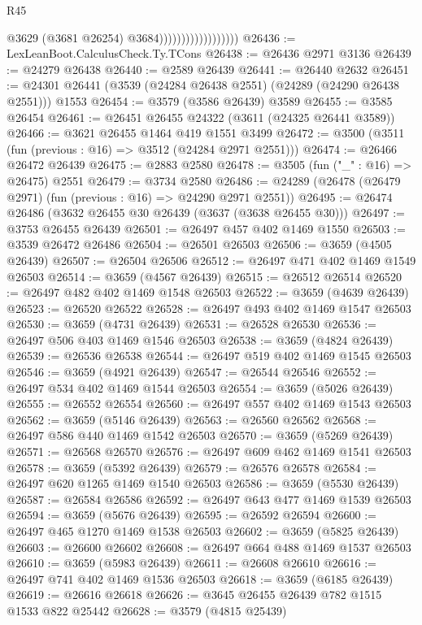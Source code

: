 \begin{lexlean}{R45}
\begin{coremodule}
                                        @3629
                                        (@3681 @26254)
                                        @3684))))))))))))))))))
@26436 := LexLeanBoot.CalculusCheck.Ty.TCons
@26438 := @26436 @2971 @3136
@26439 := @24279 @26438
@26440 := @2589 @26439
@26441 := @26440 @2632
@26451 := @24301 @26441 (@3539 (@24284 @26438 @2551) (@24289 (@24290 @26438 @2551))) @1553
@26454 := @3579 (@3586 @26439) @3589
@26455 := @3585 @26454
@26461 := @26451 @26455 @24322 (@3611 (@24325 @26441 @3589))
@26466 := @3621 @26455 @1464 @419 @1551 @3499
@26472 := @3500 (@3511 (fun (previous : @16) => @3512 (@24284 @2971 @2551)))
@26474 := @26466 @26472 @26439
@26475 := @2883 @2580
@26478 := @3505 (fun ("_" : @16) => @26475) @2551
@26479 := @3734 @2580
@26486 := @24289 (@26478 (@26479 @2971) (fun (previous : @16) => @24290 @2971 @2551))
@26495 := @26474 @26486 (@3632 @26455 @30 @26439 (@3637 (@3638 @26455 @30)))
@26497 := @3753 @26455 @26439
@26501 := @26497 @457 @402 @1469 @1550
@26503 := @3539 @26472 @26486
@26504 := @26501 @26503
@26506 := @3659 (@4505 @26439)
@26507 := @26504 @26506
@26512 := @26497 @471 @402 @1469 @1549 @26503
@26514 := @3659 (@4567 @26439)
@26515 := @26512 @26514
@26520 := @26497 @482 @402 @1469 @1548 @26503
@26522 := @3659 (@4639 @26439)
@26523 := @26520 @26522
@26528 := @26497 @493 @402 @1469 @1547 @26503
@26530 := @3659 (@4731 @26439)
@26531 := @26528 @26530
@26536 := @26497 @506 @403 @1469 @1546 @26503
@26538 := @3659 (@4824 @26439)
@26539 := @26536 @26538
@26544 := @26497 @519 @402 @1469 @1545 @26503
@26546 := @3659 (@4921 @26439)
@26547 := @26544 @26546
@26552 := @26497 @534 @402 @1469 @1544 @26503
@26554 := @3659 (@5026 @26439)
@26555 := @26552 @26554
@26560 := @26497 @557 @402 @1469 @1543 @26503
@26562 := @3659 (@5146 @26439)
@26563 := @26560 @26562
@26568 := @26497 @586 @440 @1469 @1542 @26503
@26570 := @3659 (@5269 @26439)
@26571 := @26568 @26570
@26576 := @26497 @609 @462 @1469 @1541 @26503
@26578 := @3659 (@5392 @26439)
@26579 := @26576 @26578
@26584 := @26497 @620 @1265 @1469 @1540 @26503
@26586 := @3659 (@5530 @26439)
@26587 := @26584 @26586
@26592 := @26497 @643 @477 @1469 @1539 @26503
@26594 := @3659 (@5676 @26439)
@26595 := @26592 @26594
@26600 := @26497 @465 @1270 @1469 @1538 @26503
@26602 := @3659 (@5825 @26439)
@26603 := @26600 @26602
@26608 := @26497 @664 @488 @1469 @1537 @26503
@26610 := @3659 (@5983 @26439)
@26611 := @26608 @26610
@26616 := @26497 @741 @402 @1469 @1536 @26503
@26618 := @3659 (@6185 @26439)
@26619 := @26616 @26618
@26626 := @3645 @26455 @26439 @782 @1515 @1533 @822 @25442
@26628 := @3579 (@4815 @25439)

\end{coremodule}
\end{lexlean}

